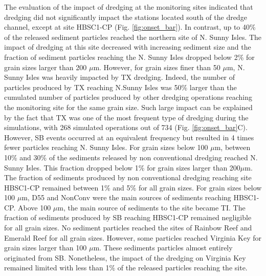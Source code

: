 The evaluation of the impact of dredging at the monitoring sites indicated that dredging did not significantly impact the stations located south of the dredge channel, except at site HBSC1-CP (Fig. \ref{fig:onset_bar}). In contrast, up to 40\% of the released sediment particles reached the northern site of N. Sunny Isles. The impact of dredging at this site decreased with increasing sediment size and the fraction of sediment particles reaching the N. Sunny Isles dropped below 2\% for grain sizes larger than 200 $\mu$m. However, for grain sizes finer than 50 $\mu$m, N. Sunny Isles was heavily impacted by TX dredging. Indeed, the number of particles produced by TX reaching N.Sunny Isles was 50\% larger than the cumulated number of particles produced by other dredging operations reaching the monitoring site for the same grain size. Such large impact can be explained by the fact that TX was one of the most frequent type of dredging during the simulations, with 268 simulated operations out of 734 (Fig. \ref{fig:onset_bar}C). However, SB events occurred at an equivalent frequency but resulted in 4 times fewer particles reaching N. Sunny Isles. For grain sizes below 100 $\mu$m, between 10\% and 30\% of the sediments released by non conventional dredging reached N. Sunny Isles. This fraction dropped below  1\% for grain sizes larger than 200$\mu$m. The fraction of sediments produced by non conventional dredging reaching site HBSC1-CP remained between 1\% and 5\% for all grain sizes. For grain sizes below 100 $\mu$m, D55 and NonConv were the main sources of sediments reaching HBSC1-CP. Above 100 $\mu$m, the main source of sediments to the site became TI. The fraction of sediments produced by SB reaching HBSC1-CP remained negligible for all grain sizes. No sediment particles reached the sites of Rainbow Reef and Emerald Reef for all grain sizes. However, some particles reached Virginia Key for grain sizes larger than 100 $\mu$m. These sediments particles almost entirely originated from SB. Nonetheless, the impact of the dredging on Virginia Key remained limited with less than 1$\%$ of the released particles reaching the site.

